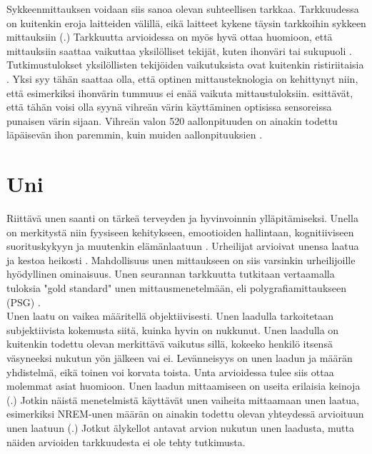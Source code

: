 \documentclass[utf8,bachelor,finnish]{bachelor}
\begin{document}
  
   Sykkeenmittauksen voidaan siis sanoa olevan suhteellisen tarkkaa.
    Tarkkuudessa on kuitenkin eroja laitteiden välillä, eikä laitteet kykene täysin tarkkoihin sykkeen mittauksiin
     (\cite{pasadyn_accuracy_2019,wang_accuracy_2017,nelson_accuracy_2019}.) Tarkkuutta arvioidessa on myös hyvä ottaa huomioon, että mittauksiin saattaa vaikuttaa
      yksilölliset tekijät, kuten ihonväri tai sukupuoli \textcite{shcherbina_accuracy_2017,hochstadt_continuous_2020}.
       Tutkimustulokset yksilöllisten tekijöiden vaikutuksista ovat kuitenkin ristiriitaisia \parencite{koerber_accuracy_2022, pasadyn_accuracy_2019}.
        Yksi syy tähän saattaa olla, että optinen mittausteknologia on kehittynyt niin, että esimerkiksi ihonvärin tummuus ei enää vaikuta mittaustuloksiin.
         \textcite{koerber_accuracy_2022} esittävät, että tähän voisi olla syynä vihreän värin käyttäminen optisissa sensoreissa punaisen värin sijaan.
          Vihreän valon 520 aallonpituuden on ainakin todettu läpäisevän ihon paremmin, kuin muiden aallonpituuksien \parencite{fallow_influence_2013}.
        
       

  \section{Uni}
  Riittävä unen saanti on tärkeä terveyden ja hyvinvoinnin ylläpitämiseksi. Unella on merkitystä niin fyysiseen kehitykseen,
   emootioiden hallintaan, kognitiiviseen suorituskykyyn ja muutenkin elämänlaatuun \parencite{watson_sleep_2017}. 
    Urheilijat arvioivat unensa laatua ja kestoa heikosti \parencite{watson_sleep_2017}. Mahdollisuus unen mittaukseen
     on siis varsinkin urheilijoille hyödyllinen ominaisuus. Unen seurannan tarkkuutta tutkitaan vertaamalla tuloksia "gold standard"
      unen mittausmenetelmään, eli polygrafiamittaukseen (PSG) \parencite{de_zambotti_measures_2016, rundo_chapter_2019, miller_validation_2022}.\\
  
  Unen laatu on vaikea määritellä objektiivisesti. Unen laadulla tarkoitetaan subjektiivista kokemusta siitä, kuinka hyvin on nukkunut.
   Unen laadulla on kuitenkin todettu olevan merkittävä vaikutus sillä, kokeeko henkilö itsensä väsyneeksi nukutun yön jälkeen vai ei. Levänneisyys on
    unen laadun ja määrän yhdistelmä, eikä toinen voi korvata toista. Unta arvioidessa tulee siis ottaa molemmat asiat huomioon.
     Unen laadun mittaamiseen on useita erilaisia keinoja (\cite{kohyama_which_2021}.)
      Jotkin näistä menetelmistä käyttävät unen vaiheita mittaamaan unen laatua, esimerkiksi
       NREM-unen määrän on ainakin todettu olevan yhteydessä arvioituun unen laatuun (\cite{krystal_measuring_2008}.)
        Jotkut älykellot antavat arvion nukutun unen laadusta, mutta näiden arvioiden tarkkuudesta ei ole tehty tutkimusta.\\
  
\end{document}
